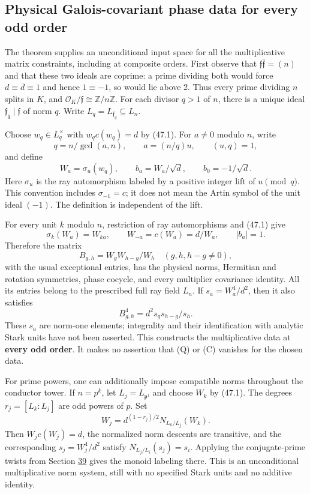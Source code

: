 \documentclass[11pt,reqno]{amsart}
\theoremstyle{plain}
\begin{document}
\subsection{Physical Galois-covariant phase data for every odd order}\label{sec:47.2}

The theorem supplies an unconditional input space for all the
multiplicative matrix constraints, including at composite orders.
First observe that
\(\mathfrak f\overline{\mathfrak f}=(n)\) and that these two
ideals are coprime: a prime dividing both would force
\(d\equiv\overline d\equiv1\) and hence \(1\equiv-1\),
so would lie above 2. Thus every prime dividing \(n\) splits in
\(K\), and \(\mathcal O_K/\mathfrak f\cong\mathbb Z/n\mathbb Z\).
For each divisor \(q>1\) of \(n\), there is a unique ideal
\(\mathfrak f_q\mid\mathfrak f\) of norm \(q\). Write
\(L_q=L_{\mathfrak f_q}\subseteq L_n\).

Choose \(w_q\in L_q^\times\) with \(w_qc(w_q)=d\) by (47.1).
For \(a\ne0\) modulo \(n\), write
\[
 q=n/\gcd(a,n),\qquad a=(n/q)u,\qquad (u,q)=1,
\]
and define
\begin{equation*}
 W_a=\sigma_u(w_q),\qquad b_a=W_a/\sqrt d,
 \qquad b_0=-1/\sqrt d. \tag{47.2}
\end{equation*}
Here \(\sigma_u\) is the ray automorphism labeled by a positive
integer lift of \(u\pmod q\). This convention includes
\(\sigma_{-1}=c\); it does not mean the Artin symbol of the unit
ideal \((-1)\). The definition is independent of the lift.

For every unit \(k\) modulo \(n\), restriction of ray automorphisms
and (47.1) give
\[
 \sigma_k(W_a)=W_{ka},\qquad W_{-a}=c(W_a)=d/W_a,
 \qquad |b_a|=1.
\]
Therefore the matrix
\[
 B_{g,h}=W_gW_{h-g}/W_h\quad(g,h,h-g\ne0),
\]
with the usual exceptional entries, has the physical norms,
Hermitian and rotation symmetries, phase cocycle, and every multiplier
covariance identity. All its entries belong to the prescribed full
ray field \(L_n\). If
\(s_a=W_a^4/d^2\), then it also satisfies
\[
 B_{g,h}^4=d^2s_gs_{h-g}/s_h.
\]
These \(s_a\) are norm-one elements; integrality and their
identification with analytic Stark units have not been asserted.
This constructs the multiplicative data at \textbf{every odd order}.
It makes no assertion that (Q) or (C) vanishes for the chosen data.

For prime powers, one can additionally impose compatible norms
throughout the conductor tower. If \(n=p^k\), let
\(L_j=L_{\mathfrak p^j}\) and choose \(W_k\) by (47.1).
The degrees \(r_j=[L_k:L_j]\) are odd powers of \(p\). Set
\[
 W_j=d^{(1-r_j)/2}N_{L_k/L_j}(W_k).
\]
Then \(W_jc(W_j)=d\), the normalized norm descents are transitive,
and the corresponding \(s_j=W_j^4/d^2\) satisfy
\(N_{L_j/L_i}(s_j)=s_i\). Applying the conjugate-prime twists from
Section \hyperref[sec:39]{39} gives the monoid labeling there. This is an unconditional
multiplicative norm system, still with no specified Stark units and
no additive identity.
\end{document}
